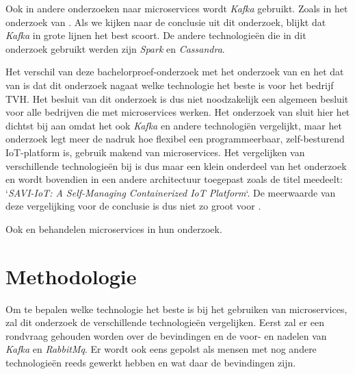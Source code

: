 Ook in andere onderzoeken naar microservices wordt \emph{Kafka} gebruikt. Zoals in het onderzoek van \textcite{Khazaei2017}. Als we kijken naar de conclusie uit dit onderzoek, blijkt dat \emph{Kafka} in grote lijnen het best scoort. De andere technologieën die in dit onderzoek gebruikt werden zijn \emph{Spark} en \emph{Cassandra}.

Het verschil van deze bachelorproef-onderzoek met het onderzoek van \textcite{Shadija2017} en het dat van \textcite{Khazaei2017} is dat dit onderzoek nagaat welke technologie het beste is voor het bedrijf TVH. Het besluit van dit onderzoek is dus niet noodzakelijk een algemeen besluit voor alle bedrijven die met microservices werken. Het onderzoek van \textcite{Khazaei2017} sluit hier het dichtst bij aan omdat het ook \emph{Kafka} en andere technologiën vergelijkt, maar het onderzoek legt meer de nadruk hoe flexibel een programmeerbaar, zelf-besturend IoT-platform is, gebruik makend van microservices. Het vergelijken van verschillende technologieën bij \textcite{Khazaei2017} is dus maar een klein onderdeel van het onderzoek en wordt bovendien in een andere architectuur toegepast zoals de titel meedeelt: `\emph{SAVI-IoT: A Self-Managing Containerized IoT Platform}`. De meerwaarde van deze vergelijking voor de conclusie is dus niet zo groot voor \textcite{Khazaei2017}.

Ook \textcite{Nycander2015} en \textcite{Cherradi2017} behandelen microservices in hun onderzoek.




\section{Methodologie}
\label{sec:methodologie}
Om te bepalen welke technologie het beste is bij het gebruiken van microservices, zal dit onderzoek de verschillende technologieën vergelijken. Eerst zal er een rondvraag gehouden worden over de bevindingen en de voor- en nadelen van \emph{Kafka} en \emph{RabbitMq}. Er wordt ook eens gepolst als mensen met nog andere technologieën reeds gewerkt hebben en wat daar de bevindingen zijn.


